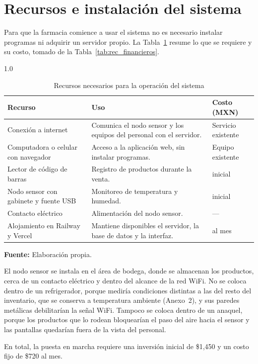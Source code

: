 
\section{Recursos e instalación del sistema}

Para que la farmacia comience a usar el sistema no es necesario instalar programas ni adquirir un servidor propio. La Tabla~\ref{tab:cap3-puesta-marcha} resume lo que se requiere y su costo, tomado de la Tabla~\ref{tab:rec_financieros}.

\begin{table}[H]
\centering
\caption{Recursos necesarios para la operación del sistema}
\label{tab:cap3-puesta-marcha}
\begin{spacing}{1.0}
\renewcommand{\arraystretch}{1.2}
\begin{tabularx}{\textwidth}{@{}>{\raggedright}p{3.6cm} X >{\raggedleft\arraybackslash}p{2.6cm}@{}}
\toprule
\textbf{Recurso} & \textbf{Uso} & \textbf{Costo (MXN)} \\
\midrule
Conexión a internet & Comunica el nodo sensor y los equipos del personal con el servidor. & Servicio existente \\[4pt]
Computadora o celular con navegador & Acceso a la aplicación web, sin instalar programas. & Equipo existente \\[4pt]
Lector de código de barras & Registro de productos durante la venta. & 500 inicial \\[4pt]
Nodo sensor con gabinete y fuente USB & Monitoreo de temperatura y humedad. & 950 inicial \\[4pt]
Contacto eléctrico & Alimentación del nodo sensor. & --- \\[4pt]
Alojamiento en Railway y Vercel & Mantiene disponibles el servidor, la base de datos y la interfaz. & 720 al mes \\
\bottomrule
\end{tabularx}
\end{spacing}
\vspace{0.2cm}
{\footnotesize \textbf{Fuente:} Elaboración propia.}
\end{table}

El nodo sensor se instala en el área de bodega, donde se almacenan los productos, cerca de un contacto eléctrico y dentro del alcance de la red WiFi. No se coloca dentro de un refrigerador, porque mediría condiciones distintas a las del resto del inventario, que se conserva a temperatura ambiente (Anexo~2), y sus paredes metálicas debilitarían la señal WiFi. Tampoco se coloca dentro de un anaquel, porque los productos que lo rodean bloquearían el paso del aire hacia el sensor y las pantallas quedarían fuera de la vista del personal.

En total, la puesta en marcha requiere una inversión inicial de \$1,450 y un costo fijo de \$720 al mes.



